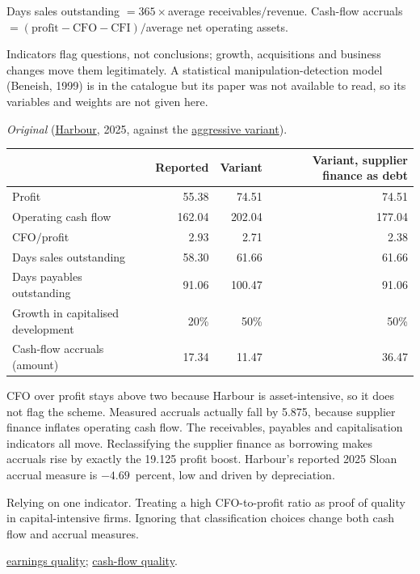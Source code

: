 \begin{qfmethod}
 Days sales outstanding $=365\times$average receivables$/$revenue. Cash-flow accruals $=(\text{profit}-\text{CFO}-\text{CFI})/$average net operating assets.

 Indicators flag questions, not conclusions; growth, acquisitions and business changes move them legitimately. A statistical manipulation-detection model (Beneish, 1999) is in the catalogue but its paper was not available to read, so its variables and weights are not given here.

 \emph{Original} (\hyperref[ex:harbour-tools-statements]{Harbour}, 2025, against the \hyperref[meth:report-quality-evaluation]{aggressive variant}).

\begin{center}\small
\begin{tabular}{@{}lrrr@{}}
\toprule
 & Reported & Variant & Variant, supplier finance as debt\\
\midrule
Profit & 55.38 & 74.51 & 74.51\\
Operating cash flow & 162.04 & 202.04 & 177.04\\
CFO$/$profit & 2.93 & 2.71 & 2.38\\
Days sales outstanding & 58.30 & 61.66 & 61.66\\
Days payables outstanding & 91.06 & 100.47 & 91.06\\
Growth in capitalised development & 20\% & 50\% & 50\%\\
Cash-flow accruals (amount) & 17.34 & 11.47 & 36.47\\
\bottomrule
\end{tabular}
\end{center}

CFO over profit stays above two because Harbour is asset-intensive, so it does not flag the scheme. Measured accruals actually fall by 5.875, because supplier finance inflates operating cash flow. The receivables, payables and capitalisation indicators all move. Reclassifying the supplier finance as borrowing makes accruals rise by exactly the 19.125 profit boost. Harbour's reported 2025 Sloan accrual measure is $-4.69$~percent, low and driven by depreciation.

 Relying on one indicator. Treating a high CFO-to-profit ratio as proof of quality in capital-intensive firms. Ignoring that classification choices change both cash flow and accrual measures.

 \hyperref[meth:earnings-quality-persistence]{earnings quality}; \hyperref[meth:cash-flow-balance-sheet-quality]{cash-flow quality}.

\end{qfmethod}

